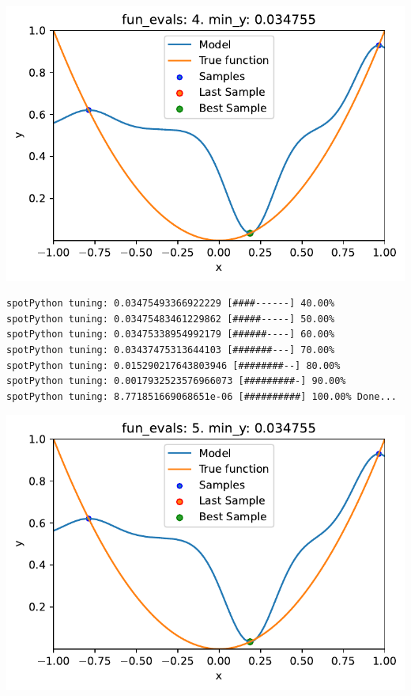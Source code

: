 \documentclass[
  letterpaper,
  DIV=11,
  numbers=noendperiod]{scrreprt}
\begin{document}
\includegraphics{010_num_spot_sklearn_surrogate_files/figure-pdf/cell-20-output-2.pdf}

\begin{verbatim}
spotPython tuning: 0.03475493366922229 [####------] 40.00% 
spotPython tuning: 0.03475483461229862 [#####-----] 50.00% 
spotPython tuning: 0.03475338954992179 [######----] 60.00% 
spotPython tuning: 0.03437475313644103 [#######---] 70.00% 
spotPython tuning: 0.015290217643803946 [########--] 80.00% 
spotPython tuning: 0.0017932523576966073 [#########-] 90.00% 
spotPython tuning: 8.771851669068651e-06 [##########] 100.00% Done...
\end{verbatim}

\includegraphics{010_num_spot_sklearn_surrogate_files/figure-pdf/cell-20-output-4.pdf}
\end{document}
